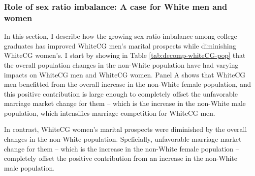 
\subsubsection{Role of sex ratio imbalance: A case for White men and women}

In this section, I describe how the growing sex ratio imbalance among college graduates has improved WhiteCG men's marital prospects while diminishing WhiteCG women's. I start by showing in Table \ref{tab:decomp-whiteCG-pop} that the overall population changes in the non-White population have had varying impacts on WhiteCG men and WhiteCG women. Panel A shows that WhiteCG men benefitted from the overall increase in the non-White female population, and this positive contribution is large enough to completely offset the unfavorable marriage market change for them -- which is the increase in the non-White male population, which intensifies marriage competition for WhiteCG men.



In contrast, WhiteCG women's marital prospects were diminished by the overall changes in the non-White population. Speficially, unfavorable marriage market change for them -- which is the increase in the non-White female population -- completely offset the positive contribution from an increase in the non-White male population. 

